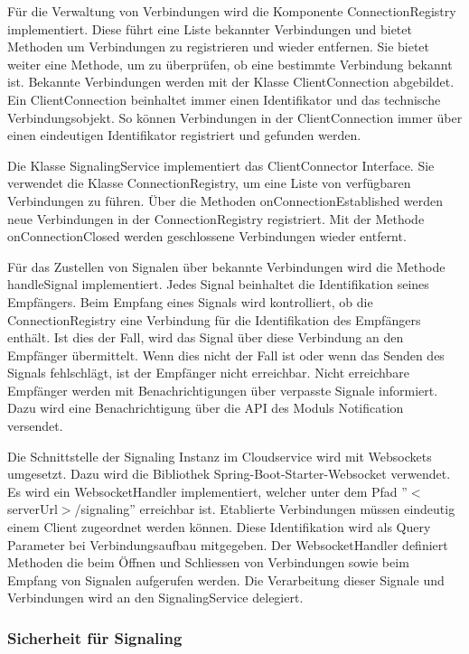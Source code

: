 Für die Verwaltung von Verbindungen wird die Komponente ConnectionRegistry implementiert.
Diese führt eine Liste bekannter Verbindungen und bietet Methoden um Verbindungen zu registrieren und wieder entfernen.
Sie bietet weiter eine Methode, um zu überprüfen, ob eine bestimmte Verbindung bekannt ist.
Bekannte Verbindungen werden mit der Klasse ClientConnection abgebildet.
Ein ClientConnection beinhaltet immer einen Identifikator und das technische Verbindungsobjekt.
So können Verbindungen in der ClientConnection immer über einen eindeutigen Identifikator registriert und gefunden werden.

Die Klasse SignalingService implementiert das ClientConnector Interface.
Sie verwendet die Klasse ConnectionRegistry, um eine Liste von verfügbaren Verbindungen zu führen.
Über die Methoden onConnectionEstablished werden neue Verbindungen in der ConnectionRegistry registriert.
Mit der Methode onConnectionClosed werden geschlossene Verbindungen wieder entfernt.

Für das Zustellen von Signalen über bekannte Verbindungen wird die Methode handleSignal implementiert.
Jedes Signal beinhaltet die Identifikation seines Empfängers.
Beim Empfang eines Signals wird kontrolliert, ob die ConnectionRegistry eine Verbindung für die Identifikation des Empfängers enthält.
Ist dies der Fall, wird das Signal über diese Verbindung an den Empfänger übermittelt.
Wenn dies nicht der Fall ist oder wenn das Senden des Signals fehlschlägt, ist der Empfänger nicht erreichbar.
Nicht erreichbare Empfänger werden mit Benachrichtigungen über verpasste Signale informiert.
Dazu wird eine Benachrichtigung über die API des Moduls Notification versendet.

Die Schnittstelle der Signaling Instanz im Cloudservice wird mit Websockets umgesetzt.
Dazu wird die Bibliothek Spring-Boot-Starter-Websocket verwendet.
Es wird ein WebsocketHandler implementiert, welcher unter dem Pfad ''$<$serverUrl$>$/signaling'' erreichbar ist.
Etablierte Verbindungen müssen eindeutig einem Client zugeordnet werden können.
Diese Identifikation wird als Query Parameter bei Verbindungsaufbau mitgegeben.
Der WebsocketHandler definiert Methoden die beim Öffnen und Schliessen von Verbindungen sowie beim Empfang von Signalen aufgerufen werden.
Die Verarbeitung dieser Signale und Verbindungen wird an den SignalingService delegiert.

\subsubsection{Sicherheit für Signaling}

